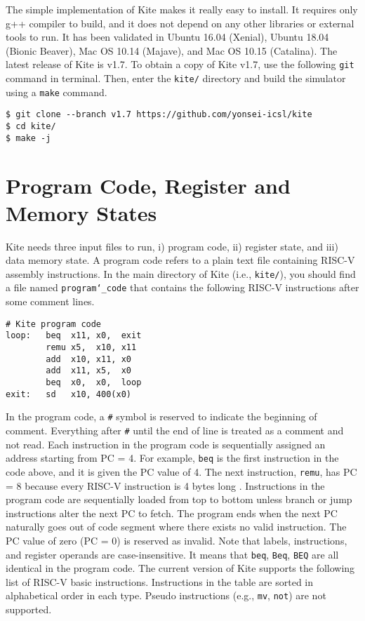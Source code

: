 \documentclass[10pt]{article}
\begin{document}
The simple implementation of Kite makes it really easy to install.
It requires only g++ compiler to build, and it does not depend on any other libraries or external tools to run.
It has been validated in Ubuntu 16.04 (Xenial), Ubuntu 18.04 (Bionic Beaver), Mac OS 10.14 (Majave), and Mac OS 10.15 (Catalina).
The latest release of Kite is v1.7.
To obtain a copy of Kite v1.7, use the following {\tt git} command in terminal.
Then, enter the {\tt kite/} directory and build the simulator using a {\tt make} command.

\begin{Verbatim}[frame=single,fontsize=\small]
$ git clone --branch v1.7 https://github.com/yonsei-icsl/kite
$ cd kite/
$ make -j
\end{Verbatim}


\section{Program Code, Register and Memory States} \label{sec:inputs}
Kite needs three input files to run, i) program code, ii) register state, and iii) data memory state.
A program code refers to a plain text file containing RISC-V assembly instructions.
In the main directory of Kite (i.e., {\tt kite/}), you should find a file named {\tt program\char`_code} that contains the following RISC-V instructions after some comment lines.
\pagebreak

\begin{Verbatim}[frame=single,fontsize=\small]
# Kite program code
loop:   beq  x11, x0,  exit
        remu x5,  x10, x11
        add  x10, x11, x0
        add  x11, x5,  x0
        beq  x0,  x0,  loop
exit:   sd   x10, 400(x0)
\end{Verbatim}

In the program code, a {\tt \#} symbol is reserved to indicate the beginning of comment.
Everything after {\tt \#} until the end of line is treated as a comment and not read.
Each instruction in the program code is sequentially assigned an address starting from PC = 4.
For example, {\tt beq} is the first instruction in the code above, and it is given the PC value of 4.
The next instruction, {\tt remu}, has PC = 8 because every RISC-V instruction is 4 bytes long \cite{waterman_riscv2019}.
Instructions in the program code are sequentially loaded from top to bottom unless branch or jump instructions alter the next PC to fetch.
The program ends when the next PC naturally goes out of code segment where there exists no valid instruction.
The PC value of zero (PC = 0) is reserved as invalid.
Note that labels, instructions, and register operands are case-insensitive.
It means that {\tt beq}, {\tt Beq}, {\tt BEQ} are all identical in the program code.
The current version of Kite supports the following list of RISC-V basic instructions.
Instructions in the table are sorted in alphabetical order in each type.
Pseudo instructions (e.g., {\tt mv}, {\tt not}) are not supported.
 
\end{document}
